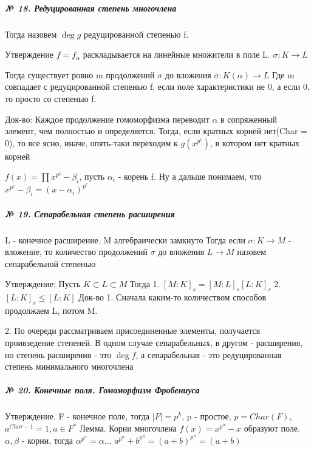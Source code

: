 \documentclass{article}
\begin{document}
\subparagraph{\tiny № 18. Редуцированная степень многочлена}

\begin{flushleft}

Тогда назовем $\deg{g}$ редуцированной степенью f.

Утверждение
$f = f_\alpha$ раскладывается на линейные множители в поле L.
$\sigma : K \rightarrow L$

Тогда существует ровно m продолжений $\sigma$ до вложения $\overline{\sigma} : K(\alpha) \rightarrow L$
Где m совпадает с редуцированной степенью f, если поле характеристики не 0, а если 0, то просто со степенью f.

Док-во:
Каждое продолжение гомоморфизма переводит $\alpha$ в сопряженный элемент, чем полностью и определяется. Тогда, если кратных корней нет(Char = 0), то все ясно, иначе, опять-таки переходим к $g(x^{p^c})$, в котором нет кратных корней

$f(x) = \prod{x^{p^c} - \beta_i}$, пусть $\alpha_i$ - корень f.
Ну а дальше понимаем, что $x^{p^c} - \beta_i = (x - \alpha_i)^{p^c}$
\end{flushleft}

\subparagraph{\tiny № 19. Сепарабельная степень расширения}

\begin{flushleft}

L - конечное расширение. M алгебраически замкнуто
Тогда если $\sigma : K \rightarrow M$ - вложение, то количество продолжений $\sigma$ до вложения $L \rightarrow M$ назовем сепарабельной степенью

Утверждение:
Пусть $K \subset L \subset M$
Тогда 1. $[M : K]_s = [M : L]_s [L : K]_s$
2. $[L : K]_s \leq [L : K]$
Док-во 1. Сначала каким-то количеством способов продолжаем L, потом M.

2. По очереди рассматриваем присоединенные элементы, получается проивзедение степеней.
В одном случае сепарабельных, в другом - расширения, но степень расширения - это $\deg{f}$, а сепарабельная - это редуцированная степень минимального многочлена

\end{flushleft}


\subparagraph{\tiny № 20. Конечные поля. Гомоморфизм Фробениуса}

Утверждение.
F - конечное поле, тогда $|F| = p^k$, p - простое, $p = Char(F)$, $a^{Char - 1} = 1, a \in F^*$
Лемма. Корни многочлена $f(x) = x^{p^n} - x$ образуют поле.
$\alpha, \beta$ - корни, тогда $\alpha^{p^n} = \alpha ... $
$a^{p^n} + b^{p^n} = (a + b)^{p^n} = (a + b)$ 
\end{document}
